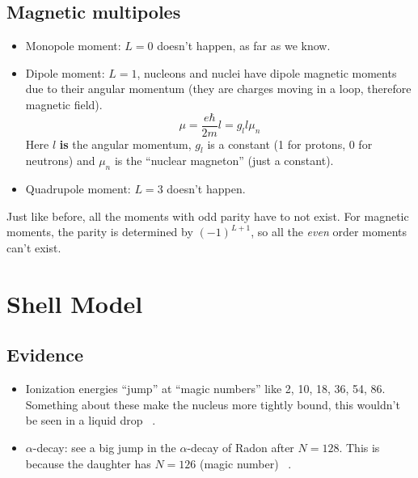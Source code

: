 \documentclass[letter]{article}
\begin{document}
\subsection*{Magnetic multipoles}

\begin{itemize}
\item Monopole moment: $L=0$ doesn't happen, as far as we know.
\item Dipole moment: $L=1$, nucleons and nuclei have dipole magnetic
  moments due to their angular momentum (they are charges moving in a
  loop, therefore magnetic field). 
  \begin{equation*}
    \mu = \frac{e\hbar}{2m}l=g_ll\mu_n
  \end{equation*}
Here $l$ \textbf{is} the angular momentum, $g_l$ is a constant (1 for
protons, 0 for neutrons) and $\mu_n$ is the ``nuclear magneton'' (just
a constant).
\item Quadrupole moment: $L=3$ doesn't happen.
\end{itemize}

Just like before, all the moments with odd parity have to not
exist. For magnetic moments, the parity is determined by $(-1)^{L+1}$,
so all the \textit{even} order moments can't exist.

\section*{Shell Model}

\subsection*{Evidence}
\begin{itemize}
\item Ionization energies ``jump'' at ``magic numbers'' like 2, 10,
  18, 36, 54, 86. Something about these make the nucleus more tightly
  bound, this wouldn't be seen in a liquid
  drop ~\cite[Lec. 12]{lecture}.
\item $\alpha$-decay: see a big jump in the $\alpha$-decay of Radon
  after $N=128$. This is because the daughter has $N=126$ (magic
  number) ~\cite[Lec. 12]{lecture}.
\end{itemize}
\end{document}
